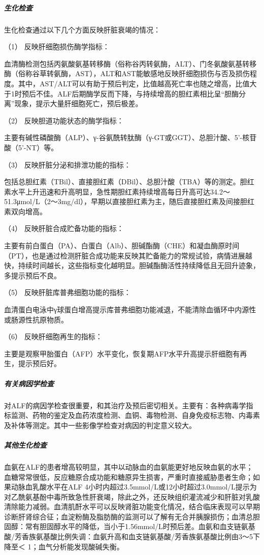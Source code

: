 \subparagraph{生化检查}

生化检查通过以下几个方面反映肝脏衰竭的情况：

\hypertarget{text00082.htmlux5cux23CHP3-6-2-2-2-3-1}{}
（1） 反映肝细胞损伤酶学指标：

血清酶检测包括丙氨酸氨基转移酶（俗称谷丙转氨酶，ALT）、门冬氨酸氨基转移酶（俗称谷草转氨酶，AST），ALT和AST能敏感地反映肝细胞损伤与否及损伤程度。其中，AST/ALT可以有助于预后判定，比值越高死亡率也随之增高，比值大于1时预后不佳。ALF后期酶学反而下降，与持续增高的胆红素相比呈“胆酶分离”现象，提示大量肝细胞死亡，预后极差。

\hypertarget{text00082.htmlux5cux23CHP3-6-2-2-2-3-2}{}
（2） 反映胆道功能状态的酶学指标：

主要有碱性磷酸酶（ALP）、γ-谷氨酰转肽酶（γ-GT或GGT）、总胆汁酸、5'{-}核苷酸（5'{-}NT）等。

\hypertarget{text00082.htmlux5cux23CHP3-6-2-2-2-3-3}{}
（3） 反映肝脏分泌和排泄功能的指标：

包括总胆红素（TBil）、直接胆红素（DBil）、总胆汁酸（TBA）等的测定。胆红素水平上升迅速和升高明显，急性期胆红素持续增高每日升高可达34.2～51.3μmol/L（2～3mg/dl），早期以直接胆红素为主，随后直接胆红素及间接胆红素双向增高。

\hypertarget{text00082.htmlux5cux23CHP3-6-2-2-2-3-4}{}
（4） 反映肝脏合成贮备功能的指标：

主要有前白蛋白（PA）、白蛋白（Alb）、胆碱酯酶（CHE）和凝血酶原时间（PT），也是通过检测肝脏合成功能来反映其贮备能力的常规试验，病情进展越快，持续时间越长，这些指标变化越明显。胆碱酯酶活性持续降低且无回升迹象，多提示预后不良。

\hypertarget{text00082.htmlux5cux23CHP3-6-2-2-2-3-5}{}
（5） 反映肝脏库普弗细胞功能的指标：

血清蛋白电泳中γ球蛋白增高提示库普弗细胞功能减退，不能清除血循环中内源性或肠源性抗原物质。

\hypertarget{text00082.htmlux5cux23CHP3-6-2-2-2-3-6}{}
（6） 反映肝细胞再生的指标：

主要是观察甲胎蛋白（AFP）水平变化，恢复期AFP水平升高提示肝细胞有再生，提示预后好。

\subparagraph{有关病因学检查}

对ALF的病因学检查很重要，和其治疗及预后密切相关。主要有：各种病毒学指标监测、药物的鉴定及血药浓度检测、血铜、毒物检测、自身免疫标志物、内毒素及补体等测定。其中一些影像学检查对病因的判定意义较大。

\subparagraph{其他生化检查}

血氨在ALF的患者增高较明显，其中以动脉血的血氨能更好地反映血氨的水平；血糖常常很低，反应糖原合成功能和糖原异生损害，严重时直接威胁患者生命；如果动脉血乳酸水平在ALF
4小时内超过3.5mmol/L或12小时超过3.0mmol/L提示为对乙酰氨基酚中毒所致急性肝衰竭，除此之外，还反映组织灌流减少和肝脏对乳酸清除能力减弱。血清肌酐水平可以反映肾脏功能变化情况，结合临床表现可以早期诊断肝肾综合征；血淀粉酶及脂肪酶的监测可以了解有无合并胰腺损伤；血清总胆固醇：常有胆固醇水平的降低，当小于1.56mmol/L时预后差。血氨和血支链氨基酸/芳香族氨基酸比例失调：血氨升高和血支链氨基酸/芳香族氨基酸比例由3～5下降至＜
1；血气分析能发现酸碱失衡。

